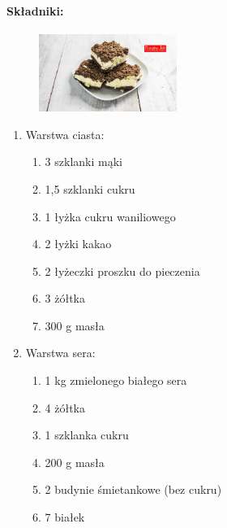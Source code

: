 \documentclass{article}
\begin{document}
    \paragraph{Składniki:}
    \begin{figure}
        \includegraphics[width=0.4\textwidth]{sernik_krolewski.jpg}
    \end{figure}
    \begin{enumerate}
        \item Warstwa ciasta:
        \begin{enumerate}
            \item 3 szklanki mąki
            \item 1,5 szklanki cukru
            \item 1 łyżka cukru waniliowego
            \item 2 łyżki kakao
            \item 2 łyżeczki proszku do pieczenia
            \item 3 żółtka
            \item 300 g masła
        \end{enumerate}
        \item Warstwa sera:
        \begin{enumerate}
            \item 1 kg zmielonego białego sera
            \item 4 żółtka
            \item 1 szklanka cukru
            \item 200 g masła
            \item 2 budynie śmietankowe (bez cukru)
            \item 7 białek
        \end{enumerate}
    \end{enumerate}
\end{document}
